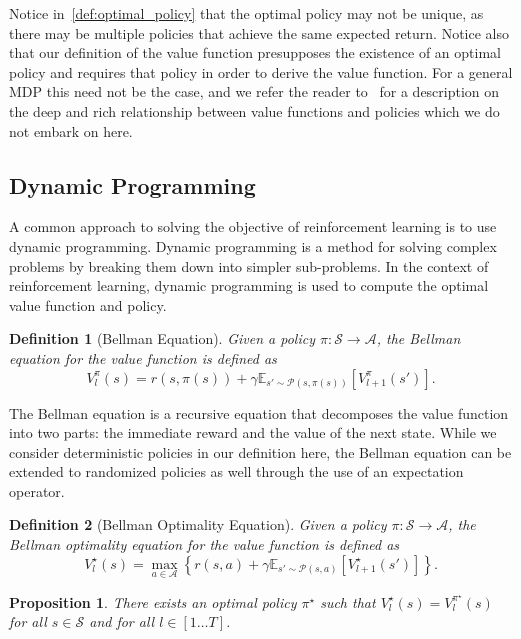 \documentclass[10pt]{article}
\newtheorem{definition}{Definition}
\renewcommand{\cite}{\citep}
\theoremstyle{plain}
\newtheorem{proposition}{Proposition}
\theoremstyle{remark}
\begin{document}
Notice in~\ref{def:optimal_policy} that the optimal policy may not be unique, as there may be multiple policies that achieve the same expected return. Notice also that our definition of the value function presupposes the existence of an optimal policy and requires that policy in order to derive the value function. For a general MDP this need not be the case, and we refer the reader to~\cite{Puterman1994} for a description on the deep and rich relationship between value functions and policies which we do not embark on here.


\subsection{Dynamic Programming}
A common approach to solving the objective of reinforcement learning is to use dynamic programming. Dynamic programming is a method for solving complex problems by breaking them down into simpler sub-problems. In the context of reinforcement learning, dynamic programming is used to compute the optimal value function and policy.

\begin{definition}[Bellman Equation]\label{def:bellman}
        Given a policy $\pi : \mathcal{S} \to \mathcal{A}$, the Bellman equation for the value function is defined as
        \[
                V^\pi_l(s) = r(s, \pi(s)) + \gamma \mathbb{E}_{s' \sim \mathcal{P}(s, \pi(s))} [V^\pi_{l+1}(s')].
        \]
\end{definition}
The Bellman equation is a recursive equation that decomposes the value function into two parts: the immediate reward and the value of the next state. While we
consider deterministic policies in our definition here, the Bellman equation can be extended to randomized policies as well through the use of an expectation operator.

\begin{definition}[Bellman Optimality Equation]\label{def:bellman_optimality}
        Given a policy $\pi : \mathcal{S} \to \mathcal{A}$, the Bellman optimality equation for the value function is defined as
        \[
                V^\star_l(s) = \max_{a \in \mathcal{A}} \left\{ r(s, a) + \gamma \mathbb{E}_{s' \sim \mathcal{P}(s, a)} [V^\star_{l+1}(s')] \right\}.
        \]
\end{definition}

\begin{proposition}\label{prop:optimal_policy_value}
        There exists an optimal policy $\pi^\star$ such that $V^\star_l(s) = V^{\pi^\star}_l(s)$ for all $s \in \mathcal{S}$ and for all $l \in [1\ldots T]$.
\end{proposition}
\end{document}
